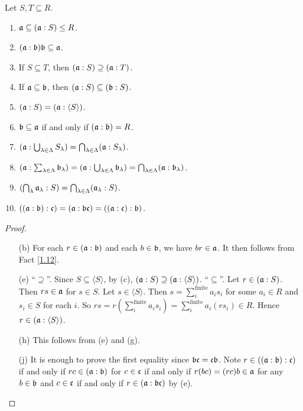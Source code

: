 \begin{fact}\label{1.54}
    Let $S,T \subseteq R$.
    \begin{enumerate}
        \item\label{1.54a} $\mathfrak{a} \subseteq (\mathfrak{a}:S) \leq R$.
        \item\label{1.54b} $(\mathfrak{a}:\mathfrak{b})\mathfrak{b} \subseteq \mathfrak{a}$. 
        \item\label{1.54c} If $S \subseteq T$, then $(\mathfrak{a}:S) \supseteq (\mathfrak{a}:T)$.
        \item\label{1.54d} If $\mathfrak{a} \subseteq \mathfrak{b}$, then $(\mathfrak{a}:S) \subseteq (\mathfrak{b}:S)$.
        \item\label{1.54e} $(\mathfrak{a}:S) = (\mathfrak{a}:\langle S \rangle)$.
        \item\label{1.54f} $\mathfrak{b} \subseteq \mathfrak{a}$ if and only if $(\mathfrak{a}:\mathfrak{b}) = R$.
        \item\label{1.54g} $(\mathfrak{a}: \bigcup_{\lambda \in \Lambda}S_\lambda) = \bigcap_{\lambda \in \Lambda} (\mathfrak{a}:S_\lambda)$.
        \item\label{1.54h} $(\mathfrak{a}: \sum_{\lambda \in \Lambda}\mathfrak{b}_\lambda) = (\mathfrak{a}: \bigcup_{\lambda \in \Lambda} \mathfrak{b}_\lambda) = \bigcap_{\lambda \in \Lambda}(\mathfrak{a}: \mathfrak{b}_\lambda)$.
        \item\label{1.54i} $(\bigcap_{\lambda}\mathfrak{a}_\lambda:S) = \bigcap_{\lambda \in \Lambda}(\mathfrak{a}_\lambda:S)$.
        \item\label{1.54j} $((\mathfrak{a}:\mathfrak{b}):\mathfrak{c}) = (\mathfrak{a}:\mathfrak{b}\mathfrak{c}) = ((\mathfrak{a}:\mathfrak{c}):\mathfrak{b})$.
    \end{enumerate}
\end{fact}

\begin{proof}
    \begin{enumerate}
        \item[(b)]
            For each $r \in (\mathfrak{a}:\mathfrak{b})$ and each $b \in \mathfrak{b}$, we have $br \in \mathfrak{a}$. It then follows from Fact \ref{1.12}.
        \item[(e)]
            ``$\supseteq$''. Since $S \subseteq \langle S \rangle$, by (c), $(\mathfrak{a}:S) \supseteq (\mathfrak{a}:\langle S \rangle)$. ``$\subseteq$''. Let $r \in (\mathfrak{a}:S)$. Then $rs \in \mathfrak{a}$ for $s \in S$. Let $s \in \langle S \rangle$. Then $s = \sum_{i}^{\text{finite}}a_is_i$ for some $a_i \in R$ and $s_i \in S$ for each $i$. So $rs = r(\sum_i^{\text{finite}}a_is_i) = \sum_i^{\text{finite}} a_i(rs_i) \in R$. Hence $r \in (\mathfrak{a}:\langle S \rangle)$.
        \item[(h)] This follows from (e) and (g).
        \item [(j)]
            It is enough to prove the first equality since $\mathfrak{b}\mathfrak{c} = \mathfrak{c}\mathfrak{b}$. Note $r \in ((\mathfrak{a}:\mathfrak{b}):\mathfrak{c})$ if and only if $rc \in (\mathfrak{a}:\mathfrak{b})$ for $c \in \mathfrak{c}$ if and only if $r(bc) = (rc)b \in \mathfrak{a}$ for any $b \in \mathfrak{b}$ and $c \in \mathfrak{c}$ if and only if $r \in (\mathfrak{a}:\mathfrak{b}\mathfrak{c})$ by (e). \qedhere
    \end{enumerate}
\end{proof}

